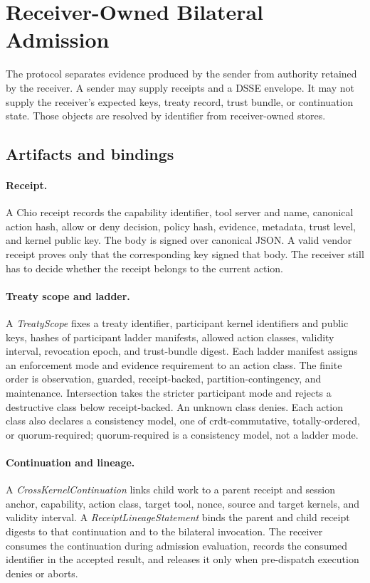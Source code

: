 \section{Receiver-Owned Bilateral Admission}
\label{sec:design}

The protocol separates evidence produced by the sender from authority retained by the receiver. A sender may supply receipts and a DSSE envelope. It may not supply the receiver's expected keys, treaty record, trust bundle, or continuation state. Those objects are resolved by identifier from receiver-owned stores.

\subsection{Artifacts and bindings}

\paragraph{Receipt.}
A Chio receipt records the capability identifier, tool server and name, canonical action hash, allow or deny decision, policy hash, evidence, metadata, trust level, and kernel public key. The body is signed over canonical JSON. A valid vendor receipt proves only that the corresponding key signed that body. The receiver still has to decide whether the receipt belongs to the current action.

\paragraph{Treaty scope and ladder.}
A \emph{TreatyScope} fixes a treaty identifier, participant kernel identifiers and public keys, hashes of participant ladder manifests, allowed action classes, validity interval, revocation epoch, and trust-bundle digest. Each ladder manifest assigns an enforcement mode and evidence requirement to an action class. The finite order is observation, guarded, receipt-backed, partition-contingency, and maintenance. Intersection takes the stricter participant mode and rejects a destructive class below receipt-backed. An unknown class denies. Each action class also declares a consistency model, one of crdt-commutative, totally-ordered, or quorum-required; quorum-required is a consistency model, not a ladder mode.

\paragraph{Continuation and lineage.}
A \emph{CrossKernelContinuation} links child work to a parent receipt and session anchor, capability, action class, target tool, nonce, source and target kernels, and validity interval. A \emph{ReceiptLineageStatement} binds the parent and child receipt digests to that continuation and to the bilateral invocation. The receiver consumes the continuation during admission evaluation, records the consumed identifier in the accepted result, and releases it only when pre-dispatch execution denies or aborts.

